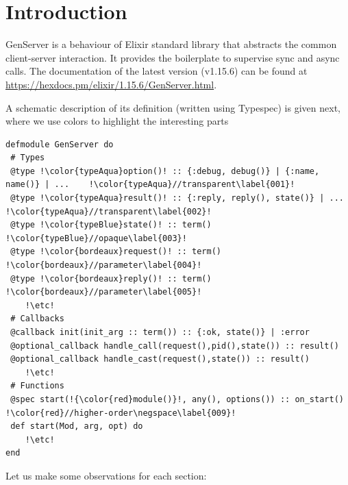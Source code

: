 \documentclass[a4paper,10pt]{article}
\author{Aghilas Y. Boussaa and Giuseppe Castagna}
\begin{document}
\section{Introduction}


GenServer is a behaviour of Elixir standard library that abstracts the
common client-server interaction. It provides the boilerplate to
supervise sync and async calls. The documentation of the latest
version (v1.15.6) can be found at \url{https://hexdocs.pm/elixir/1.15.6/GenServer.html}.

A schematic description of its definition (written using Typespec)
is given next, where we use colors to highlight the
interesting parts
\begin{verbatim}
defmodule GenServer do
 # Types  
 @type !\color{typeAqua}option()! :: {:debug, debug()} | {:name, name()} | ...    !\color{typeAqua}//transparent\label{001}!
 @type !\color{typeAqua}result()! :: {:reply, reply(), state()} | ...             !\color{typeAqua}//transparent\label{002}!
 @type !\color{typeBlue}state()! :: term()                                        !\color{typeBlue}//opaque\label{003}!
 @type !\color{bordeaux}request()! :: term()                                      !\color{bordeaux}//parameter\label{004}!
 @type !\color{bordeaux}reply()! :: term()                                        !\color{bordeaux}//parameter\label{005}!
    !\etc!
 # Callbacks
 @callback init(init_arg :: term()) :: {:ok, state()} | :error 
 @optional_callback handle_call(request(),pid(),state()) :: result() 
 @optional_callback handle_cast(request(),state()) :: result()       
    !\etc!
 # Functions
 @spec start(!{\color{red}module()}!, any(), options()) :: on_start()          !\color{red}//higher-order\negspace\label{009}!
 def start(Mod, arg, opt) do
    !\etc!
end
\end{verbatim}
Let us make some observations for each section:
\end{document}
